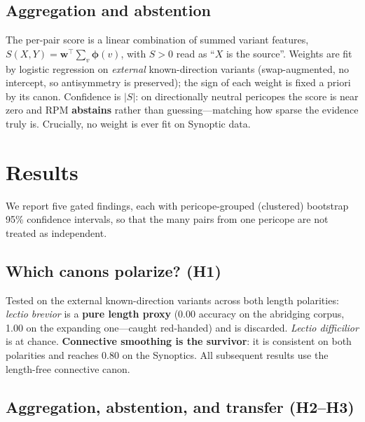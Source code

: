 \documentclass[11pt,letterpaper]{article}
\begin{document}
\subsection{Aggregation and abstention}

The per-pair score is a linear combination of summed variant features,
$S(X,Y)=\mathbf{w}^{\!\top}\!\sum_v \boldsymbol{\phi}(v)$, with $S>0$ read as ``$X$ is the
source''. Weights are fit by logistic regression on \textit{external} known-direction variants
(swap-augmented, no intercept, so antisymmetry is preserved); the sign of each weight is fixed a
priori by its canon. Confidence is $|S|$: on directionally neutral pericopes the score is near
zero and RPM \textbf{abstains} rather than guessing---matching how sparse the evidence truly is.
Crucially, no weight is ever fit on Synoptic data.

\section{Results}
\label{sec:results}

We report five gated findings, each with pericope-grouped (clustered) bootstrap 95\% confidence
intervals, so that the many pairs from one pericope are not treated as independent.

\subsection{Which canons polarize? (H1)}

Tested on the external known-direction variants across both length polarities: \textit{lectio
brevior} is a \textbf{pure length proxy} (0.00 accuracy on the abridging corpus, 1.00 on the
expanding one---caught red-handed) and is discarded. \textit{Lectio difficilior} is at chance.
\textbf{Connective smoothing is the survivor}: it is consistent on both polarities and reaches
0.80 on the Synoptics. All subsequent results use the length-free connective canon.

\subsection{Aggregation, abstention, and transfer (H2--H3)}
\end{document}
